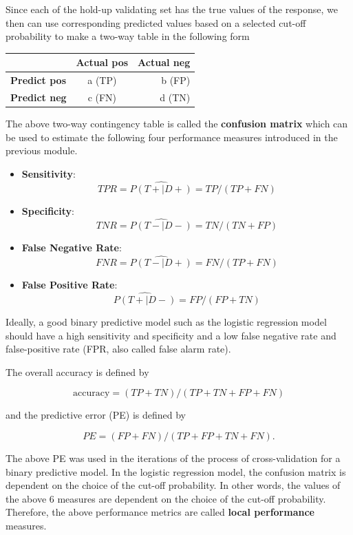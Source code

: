 \documentclass[
]{book}
\begin{document}
Since each of the hold-up validating set has the true values of the response, we then can use corresponding predicted values based on a selected cut-off probability to make a two-way table in the following form

\begin{longtable}[]{@{}lcr@{}}
\toprule\noalign{}
& Actual pos & Actual neg \\
\midrule\noalign{}
\endhead
\bottomrule\noalign{}
\endlastfoot
\textbf{Predict pos} & a (TP) & b (FP) \\
\textbf{Predict neg} & c (FN) & d (TN) \\
\end{longtable}

The above two-way contingency table is called the \textbf{confusion matrix} which can be used to estimate the following four performance measures introduced in the previous module.

\begin{itemize}
\item
  \textbf{Sensitivity}: \[TPR = \widehat{P( T+ | D+)} = TP/(TP+FN)\]
\item
  \textbf{Specificity}: \[TNR = \widehat{P( T- | D-)}=TN/(TN+FP)\]
\item
  \textbf{False Negative Rate}: \[FNR = \widehat{P( T- | D+)} = FN/(TP+FN)\]
\item
  \textbf{False Positive Rate}: \[\widehat{P( T+ | D-)}=FP/(FP+TN)\]
\end{itemize}

Ideally, a good binary predictive model such as the logistic regression model should have a high sensitivity and specificity and a low false negative rate and false-positive rate (FPR, also called false alarm rate).

The overall accuracy is defined by

\[
\text{accuracy} = (TP + TN)/(TP+TN+FP+FN)
\]

and the predictive error (PE) is defined by

\[
PE = (FP + FN)/(TP+FP+TN+FN).
\]

The above PE was used in the iterations of the process of cross-validation for a binary predictive model. In the logistic regression model, the confusion matrix is dependent on the choice of the cut-off probability. In other words, the values of the above 6 measures are dependent on the choice of the cut-off probability. Therefore, the above performance metrics are called \textbf{local performance} measures.
\end{document}
